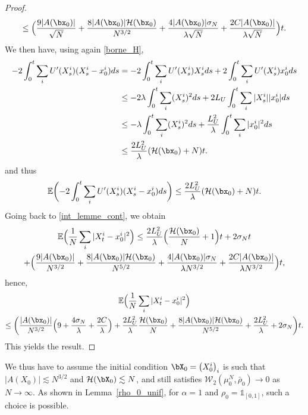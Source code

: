 \begin{proof}
\begin{multline*}
\leq \Bigl(\frac{9|A(\bx_0)|}{\sqrt{N}}+\frac{8|A(\bx_0)|\mathcal{H}(\bx_0)}{N^{3/2}}+\frac{4|A(\bx_0)|\sigma_N}{\lambda\sqrt{N}}+\frac{2C|A(\bx_0)|}{\lambda \sqrt{N}}\Bigr)t.
\end{multline*}
We then have, using again \eqref{borne_H},
\begin{align*}
-2 \int_0^t\sum_iU'(X^i_s)(X^i_s-x^i_0)ds&=-2\int_0^t\sum_iU'(X^i_s)X^i_sds+2\int_0^t\sum_iU'(X^i_s)x^i_0ds\\
&\leq -2\lambda\int_0^t\sum_i(X^i_s)^2ds+2L_U\int_0^t\sum_i|X^i_s||x^i_0|ds\\
&\leq -\lambda\int_0^t\sum_i(X^i_s)^2ds+\frac{L_U^2}{\lambda}\int_0^t\sum_i|x^i_0|^2ds\\
&\leq \frac{2L_U^2}{\lambda}(\mathcal{H}(\bx_0)+N)t.
\end{align*}
and thus
\begin{align*}
\mathbb{E}\biggl(-2\int_0^t\sum_iU'(X^i_s)(X^i_s-x^i_0)ds\biggr)\leq \frac{2L_U^2}{\lambda}(\mathcal{H}(\bx_0)+N)t.
\end{align*}
Going back to \eqref{int_lemme_cont}, we obtain
\begin{multline*}
\mathbb{E}\Bigl(\frac{1}{N}\sum_{i}|X^i_t-x^i_0|^2\Bigr)\leq \frac{2L_U^2}{\lambda}\Bigl(\frac{\mathcal{H}(\bx_0)}{N}+1\Bigr)t+2\sigma_N t\\
+\Bigl(\frac{9|A(\bx_0)|}{N^{3/2}}+\frac{8|A(\bx_0)|\mathcal{H}(\bx_0)}{N^{5/2}}+\frac{4|A(\bx_0)|\sigma_N}{\lambda N^{3/2}}+\frac{2C|A(\bx_0)|}{\lambda N^{3/2}}\Bigr)t,
\end{multline*}
hence,
\begin{multline*}
\mathbb{E}\Bigl(\frac{1}{N}\sum_{i}|X^i_t-x^i_0|^2\Bigr)\\
\leq \biggl(\frac{|A(\bx_0)|}{N^{3/2}}\Bigl(9+\frac{4\sigma_N}{\lambda}+\frac{2C}{\lambda}\Bigr)
+\frac{2L_U^2}{\lambda}\frac{\mathcal{H}(\bx_0)}{N}+\frac{8|A(\bx_0)|\mathcal{H}(\bx_0)}{N^{5/2}}+\frac{2L_U^2}{\lambda}+2\sigma_N\biggr)t.
\end{multline*}
This yields the result.
\end{proof}

\begin{remark}
We thus have to assume the initial condition $\bX_0=\left(X^i_0\right)_i$ is such that $|A(X_0)|\lesssim N^{3/2}$ and $\mathcal{H}(\bX_0)\lesssim N$, and still satisfies $\mathcal{W}_2(\mu^N_0,\bar{\rho}_0)\to0$ as $N\to\infty$. As shown in Lemma~\ref{rho_0_unif}, for $\alpha=1$ and $\rho_0=\mathds{1}_{[0,1]}$, such a choice is possible.
\end{remark}
